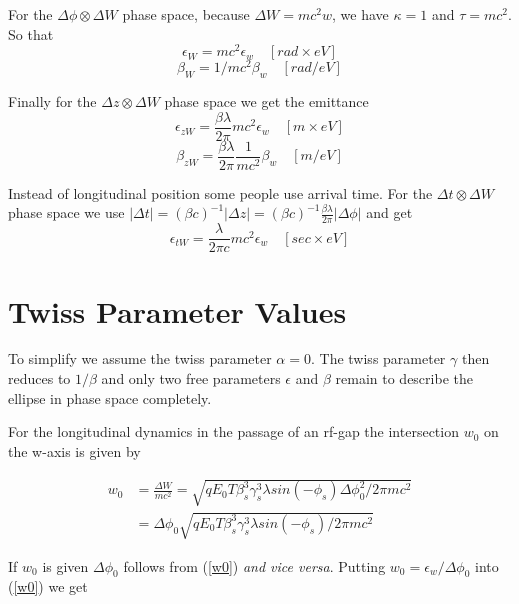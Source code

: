 \documentclass{article}
\begin{document}
For the $ \Delta\phi\otimes\Delta W $ phase space, because $ \Delta W = mc^{2} w $, we have $ \kappa = 1 $ and $ \tau = mc^{2} $.
So that 
\begin{equation}
\epsilon_{W} = mc^{2}\epsilon_{w}\quad [rad\times eV] \label{}
\end{equation}
\begin{equation}
\beta_{W} = 1/mc^{2}\beta_{w}\quad  [rad/eV] \label{}
\end{equation}

Finally for the $ \Delta z\otimes\Delta W $ phase space we get the emittance
\begin{equation}
\epsilon_{zW} = \frac{\beta \lambda} {2 \pi}mc^{2}\epsilon_{w}\quad  [m\times eV] \label{}
\end{equation}
\begin{equation}
\beta_{zW} = \frac{\beta \lambda} {2 \pi}\frac{1}{mc^{2}}\beta_{w}\quad  [m/eV] \label{}
\end{equation}

Instead of longitudinal position some people use arrival time. For the $ \Delta t\otimes \Delta W $ phase space we use 
$|\Delta t| = (\beta c)^{-1}|\Delta z| = (\beta c)^{-1} \frac{\beta\lambda}{2\pi} |\Delta \phi|$ and get
\begin{equation}
\epsilon_{tW} = \frac{\lambda} {2 \pi c} mc^{2}\epsilon_{w}\quad  [sec\times eV]\label{}
\end{equation}

\section{Twiss Parameter Values}
To simplify we assume the twiss parameter $ \alpha = 0 $. The twiss  parameter $ \gamma $ then reduces to $ 1/{\beta} $
and only two free parameters $ \epsilon $ and $ \beta $ remain to describe the ellipse in phase space completely.

For the longitudinal dynamics in the passage of an rf-gap the intersection \(w_{0}\) on the w-axis is given by

\begin{align}
w_{0}&=\frac{\Delta W} {mc^{2}} = \sqrt{qE_{0}T\beta_{s}^{3}\gamma_{s}^{3}\lambda sin(-\phi_{s})\Delta\phi_{0}^{2}/2\pi mc^{2}} \\
     &= \Delta\phi_{0}\sqrt{qE_{0}T\beta_{s}^{3}\gamma_{s}^{3}\lambda sin(-\phi_{s})/2\pi mc^{2}} \label{w0}
\end{align}

If $w_{0}$ is given $\Delta\phi_{0}$ follows from (\ref{w0}) \emph{and vice versa}. Putting $ w_{0} = \epsilon_{w}/\Delta\phi_{0}$ into (\ref{w0})
we get
\end{document}
